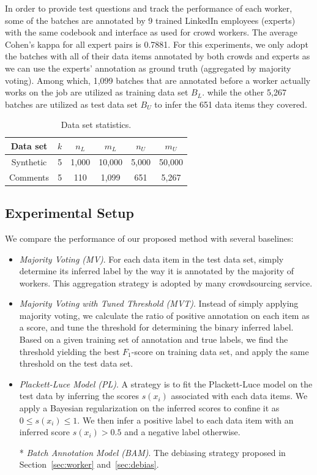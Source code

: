 In order to provide test questions and track the performance of each worker, 
some of the batches are annotated by 9 trained LinkedIn employees (experts) with the same codebook and interface as used for crowd workers.  
The average Cohen's kappa for all expert pairs is 0.7881.  
For this experiments, we only adopt the batches with all of their data items annotated by both crowds and experts 
as we can use the experts' annotation as ground truth (aggregated by majority voting).  
Among which, 1,099 batches that are annotated before a worker actually works on the job 
are utilized as training data set $B_L$.  
while the other 5,267 batches are utilized as test data set $B_U$ to infer the 651 data items they covered.  


\begin{table}[!t]
\centering
 {\caption{Data set statistics.}\label{tab:dataset}}
{
  \begin{tabular}{c||c|c|c|c|c}
  \hline
  Data set & $k$ & $n_L$  &  $m_L$ & $n_U$  & $m_U$ \\ \hline \hline
 Synthetic & 5 & 1,000 & 10,000 & 5,000 & 50,000 \\ \hline 
 Comments  & 5 & 110   & 1,099  & 651   & 5,267  \\ \hline  
  \end{tabular}
}
\end{table}


\subsection{Experimental Setup}

We compare the performance of our proposed method with several baselines:
\begin{itemize}
  \item \emph{Majority Voting (MV)}.
        For each data item in the test data set, 
        simply determine its inferred label by the way it is annotated by the majority of workers.  
        This aggregation strategy is adopted by many crowdsourcing service.  
  \item \emph{Majority Voting with Tuned Threshold (MVT)}.
        Instead of simply applying majority voting, 
        we calculate the ratio of positive annotation on each item as a score, 
        and tune the threshold for determining the binary inferred label.  
        Based on a given training set of annotation and true labels, 
        we find the threshold yielding the best $F_1$-score on training data set, 
        and apply the same threshold on the test data set.  
  \item \emph{Plackett-Luce Model (PL)}.  
        A strategy is to fit the Plackett-Luce model on the test data by inferring the scores $s(x_i)$ associated with each data items.  
        We apply a Bayesian regularization on the inferred scores to confine it as $0 \leq s(x_i) \leq 1$.  
        We then infer a positive label to each data item with an inferred score $s(x_i) > 0.5$ and a negative label otherwise.  
  \item[*] \emph{Batch Annotation Model (BAM)}.  
        The debiasing strategy proposed in Section~\ref{sec:worker} and~\ref{sec:debias}.
\end{itemize}

